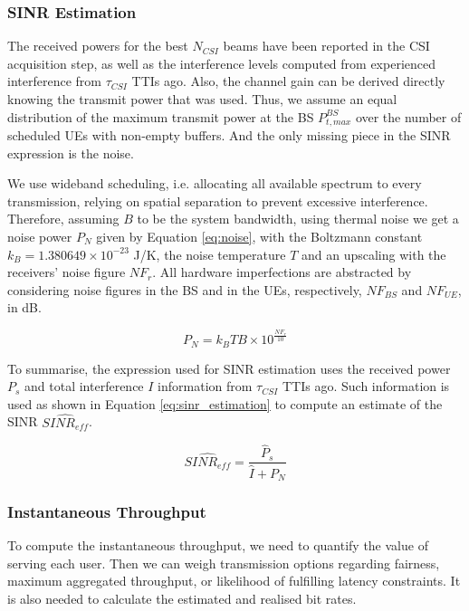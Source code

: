 \subsubsection*{SINR Estimation}

The received powers for the best $N_{CSI}$ beams have been reported in the CSI acquisition step, as well as the interference levels computed from experienced interference from $\tau_{CSI}$ TTIs ago. Also, the channel gain can be derived directly knowing the transmit power that was used. Thus, we assume an equal distribution of the maximum transmit power at the BS $P_{t, max} ^ {BS}$ over the number of scheduled UEs with non-empty buffers. And the only missing piece in the SINR expression is the noise. 

We use wideband scheduling, i.e. allocating all available spectrum to every transmission, relying on spatial separation to prevent excessive interference. Therefore, assuming $B$ to be the system bandwidth, using thermal noise we get a noise power $P_N$ given by Equation \eqref{eq:noise}, with the Boltzmann constant $k_B = 1.380649 \times 10^{-23}$ J/K, the noise temperature $T$ and an upscaling with the receivers' noise figure $NF_r$. All hardware imperfections are abstracted by considering noise figures in the \acs{BS} and in the \acsp{UE}, respectively, $NF_{BS}$ and $NF_{UE}$, in dB.


\begin{equation} \label{eq:noise}
    P_N = k_B T B \times 10^{\frac{NF_r}{10}}
\end{equation}

To summarise, the expression used for SINR estimation uses the received power $P_s$ and total interference $I$ information from $\tau_{CSI}$ TTIs ago. Such information is used as shown in Equation \ref{eq:sinr_estimation} to compute an estimate of the SINR $\hat{SINR_{eff}}$.

\begin{equation} \label{eq:sinr_estimation}
    \hat{SINR_{eff}} = \frac{\hat{P}_s}{\hat{I} + P_N} 
\end{equation}

\subsubsection*{Instantaneous Throughput}

To compute the instantaneous throughput, we need to quantify the value of serving each user. Then we can weigh transmission options regarding fairness, maximum aggregated throughput, or likelihood of fulfilling latency constraints. It is also needed to calculate the estimated and realised bit rates.

